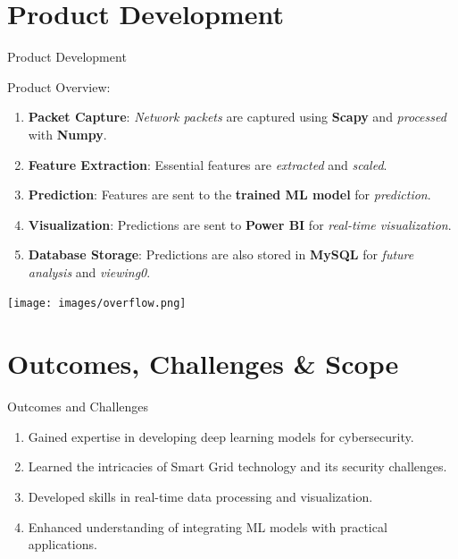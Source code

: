 \documentclass{beamer}
\begin{document}
\section{Product Development}
\begin{frame}{Product Development}
\begin{minipage}{0.6\textwidth}
    Product Overview:
    \begin{enumerate}
        \item \textbf{Packet Capture}: \textit{Network packets} are captured using \textbf{Scapy} and \textit{processed} with \textbf{Numpy}.
        \item \textbf{Feature Extraction}: Essential features are \textit{extracted} and \textit{scaled}.
        \item \textbf{Prediction}: Features are sent to the \textbf{trained ML model} for \textit{prediction}.
        \item \textbf{Visualization}: Predictions are sent to \textbf{Power BI} for \textit{real-time visualization}.
        \item \textbf{Database Storage}: Predictions are also stored in \textbf{MySQL} for \textit{future analysis} and \textit{viewing0}.
    \end{enumerate}
\end{minipage}%
\begin{minipage}{0.4\textwidth}
\texttt{[image: images/overflow.png]}
\end{minipage}
\end{frame}

\section{Outcomes, Challenges \& Scope}

\begin{frame}{Outcomes and Challenges}
    \begin{enumerate}
        \item Gained expertise in developing deep learning models for cybersecurity.
        \item Learned the intricacies of Smart Grid technology and its security challenges.
        \item Developed skills in real-time data processing and visualization.
        \item Enhanced understanding of integrating ML models with practical applications.
    \end{enumerate}
\end{frame}
\end{document}
